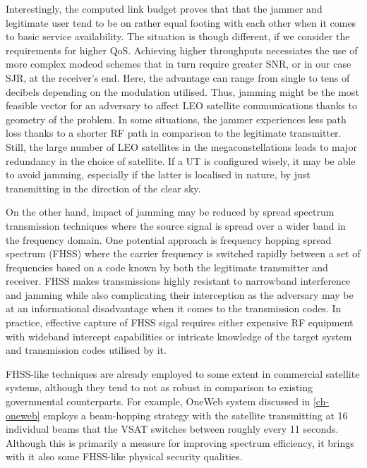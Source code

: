 \documentclass[english, 12pt, a4paper, elec, utf8, a-1b, online]{aaltothesis}
\begin{document}
Interestingly, the computed link budget proves that that the jammer and legitimate user tend to be on rather equal footing with each other when it comes to basic service availability. The situation is though different, if we consider the requirements for higher QoS.
Achieving higher throughputs necessiates the use of more complex modcod schemes that in turn require greater SNR, or in our case SJR, at the receiver's end. Here, the advantage can range from single to tens of decibels depending on the modulation utilised.
Thus, jamming might be the most feasible vector for an adversary to affect LEO satellite communications thanks to geometry of the problem.
In some situations, the jammer experiences less path loss thanks to a shorter RF path in comparison to the legitimate transmitter.
Still, the large number of LEO satellites in the megaconstellations leads to major redundancy in the choice of satellite.
If a UT is configured wisely, it may be able to avoid jamming, especially if the latter is localised in nature, by just transmitting in the direction of the clear sky.

On the other hand, impact of jamming may be reduced by spread spectrum transmission techniques where the source signal is spread over a wider band in the frequency domain.
One potential approach is frequency hopping spread spectrum (FHSS) where the carrier frequency is switched rapidly between a set of frequencies based on a code known by both the legitimate transmitter and receiver.
FHSS makes transmissions highly resistant to narrowband interference and jamming while also complicating their interception as the adversary may be at an informational disadvantage when it comes to the transmission codes.
In practice, effective capture of FHSS sigal requires either expensive RF equipment with wideband intercept capabilities or intricate knowledge of the target system and transmission codes utilised by it.

FHSS-like techniques are already employed to some extent in commercial satellite systems, although they tend to not as robust in comparison to existing governmental counterparts.
For example, OneWeb system discussed in \ref{ch-oneweb} employs a beam-hopping strategy with the satellite transmitting at 16 individual beams that the VSAT switches between roughly every 11 seconds.
Although this is primarily a measure for improving spectrum efficiency, it brings with it also some FHSS-like physical security qualities.

\end{document}
